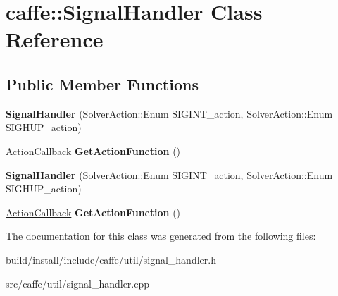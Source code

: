 \hypertarget{classcaffe_1_1_signal_handler}{}\section{caffe\+:\+:Signal\+Handler Class Reference}
\label{classcaffe_1_1_signal_handler}
\subsection*{Public Member Functions}
\begin{DoxyCompactItemize}
\item 
\mbox{\label{classcaffe_1_1_signal_handler_acbe6d04edd98cd7481653e82a2fcdf52}} 
{\bfseries Signal\+Handler} (Solver\+Action\+::\+Enum S\+I\+G\+I\+N\+T\+\_\+action, Solver\+Action\+::\+Enum S\+I\+G\+H\+U\+P\+\_\+action)
\item 
\mbox{\label{classcaffe_1_1_signal_handler_a50b4b45b2e63b77b3c74f1e32e30f2d9}} 
\mbox{\hyperlink{namespacecaffe_a117e25cc445c0d716517761a0fbc6daf}{Action\+Callback}} {\bfseries Get\+Action\+Function} ()
\item 
\mbox{\label{classcaffe_1_1_signal_handler_acbe6d04edd98cd7481653e82a2fcdf52}} 
{\bfseries Signal\+Handler} (Solver\+Action\+::\+Enum S\+I\+G\+I\+N\+T\+\_\+action, Solver\+Action\+::\+Enum S\+I\+G\+H\+U\+P\+\_\+action)
\item 
\mbox{\label{classcaffe_1_1_signal_handler_a50b4b45b2e63b77b3c74f1e32e30f2d9}} 
\mbox{\hyperlink{namespacecaffe_a117e25cc445c0d716517761a0fbc6daf}{Action\+Callback}} {\bfseries Get\+Action\+Function} ()
\end{DoxyCompactItemize}


The documentation for this class was generated from the following files\+:\begin{DoxyCompactItemize}
\item 
build/install/include/caffe/util/signal\+\_\+handler.\+h\item 
src/caffe/util/signal\+\_\+handler.\+cpp\end{DoxyCompactItemize}
